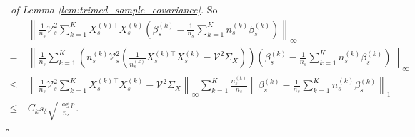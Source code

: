 \documentclass[12pt]{article}
\newenvironment{pf}{{\noindent \it Proof}\ }{\hfill $\square$\par}
\begin{document}
\begin{pf}{\it of Lemma \ref{lem:trimed_sample_covariance}. }
So
\begin{align*}
     & \left\|\frac{1}{n_s}\mathcal{V}^2_s \sum_{k=1}^K X_s^{(k)\top}X_s^{(k)}\left(\beta_s^{(k)}-\frac{1}{n_s}\sum_{k=1}^K n_s^{(k)}\beta_s^{(k)}\right)\right\|_{\infty} \\=\ & \left\|\frac{1}{n_s} \sum_{k=1}^K \left(n_s^{(k)}\mathcal{V}^2_s\left(\frac{1}{n_s^{(k)}}X_s^{(k)\top}X_s^{(k)}-\mathcal{V}^2\Sigma_X\right)\right)\left(\beta_s^{(k)}-\frac{1}{n_s}\sum_{k=1}^K n_s^{(k)}\beta_s^{(k)}\right)\right\|_{\infty}
     \\\le \ &
     \left\|\frac{1}{n_s}\mathcal{V}^2_s \sum_{k=1}^K X_s^{(k)\top}X_s^{(k)} - \mathcal{V}^2\Sigma_X\right\|_{\infty}\sum_{k=1}^K \frac{n_s^{(k)}}{n_s}\left\|\beta_s^{(k)}-\frac{1}{n_s}\sum_{k=1}^K n_s^{(k)}\beta_s^{(k)}\right\|_{1}\\\le \ &
      C_k s_\delta\sqrt{\frac{\log p}{n_s}}. 
\end{align*}
\end{pf}
\end{document}
